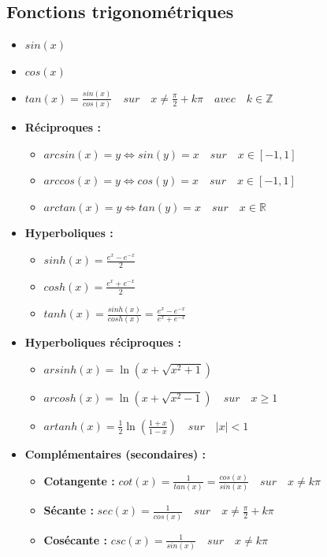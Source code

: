 \documentclass[12]{article}%
\theoremstyle{plain}
\theoremstyle{definition}
\theoremstyle{remark}
\begin{document}
\subsection{Fonctions trigonométriques}
\begin{itemize}
	\item \( \boxed{sin(x)} \)
	\item \( \boxed{cos(x)} \)
	\item \( \boxed{tan(x) = \frac{sin(x)}{cos(x)}} \quad sur \quad x \neq \frac{\pi}{2} + k\pi \quad avec \quad k \in \mathbb{Z} \)
	
	\item \textbf{Réciproques :}
	\begin{itemize}
		\item \( \boxed{arcsin(x) = y \Leftrightarrow sin(y) = x} \quad sur \quad x \in [-1,1] \)
		\item \( \boxed{arccos(x) = y \Leftrightarrow cos(y) = x} \quad sur \quad x \in [-1,1] \)
		\item \( \boxed{arctan(x) = y \Leftrightarrow tan(y) = x} \quad sur \quad x \in \mathbb{R} \)
	\end{itemize}
	
	\item \textbf{Hyperboliques :}
	\begin{itemize}
		\item \( \boxed{sinh(x) = \frac{e^{x} - e^{-x}}{2}} \) 
		\item \( \boxed{cosh(x) = \frac{e^{x} + e^{-x}}{2}} \)
		\item \( \boxed{tanh(x) = \frac{sinh(x)}{cosh(x)} = \frac{e^{x} - e^{-x}}{e^{x} + e^{-x}}} \)
	\end{itemize}
	
	\item \textbf{Hyperboliques réciproques :}
	\begin{itemize}
		\item \( \boxed{arsinh(x) = \ln\left(x + \sqrt{x^2 + 1}\right)} \)
		\item \( \boxed{arcosh(x) = \ln\left(x + \sqrt{x^2 - 1}\right)} \quad sur \quad x \geq 1 \)
		\item \( \boxed{artanh(x) = \frac{1}{2} \ln\left(\frac{1 + x}{1 - x}\right)} \quad sur \quad |x| < 1 \)
	\end{itemize}
	
	\item \textbf{Complémentaires (secondaires) :}
	\begin{itemize}
		\item \textbf{Cotangente :} \( \boxed{cot(x) = \frac{1}{tan(x)} = \frac{cos(x)}{sin(x)}} \quad sur \quad x \neq k\pi \)
		\item \textbf{Sécante :} \( \boxed{sec(x) = \frac{1}{cos(x)}} \quad sur \quad x \neq \frac{\pi}{2} + k\pi \)
		\item \textbf{Cosécante :} \( \boxed{csc(x) = \frac{1}{sin(x)}} \quad sur \quad x \neq k\pi \)
	\end{itemize}
	

\end{itemize}
\end{document}
